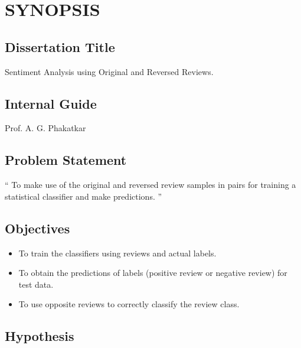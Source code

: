 \documentclass[oneside,a4paper,12pt]{pictreport}
\begin{document}
\setlength{\parindent}{11mm}
\chapter{SYNOPSIS}


\section{Dissertation Title}
Sentiment Analysis using Original and Reversed Reviews.



\section{Internal Guide}
Prof. A. G. Phakatkar



\section{Problem Statement}
\label{sec:problem_def}
`` To make use of the original and reversed review samples in pairs for training a
statistical classifier and make predictions. ''

\section{Objectives}
\begin{itemize}

    \item To train the classifiers using reviews and actual labels.
    \item To obtain the predictions of labels (positive review or negative review) for test data.
    \item To use opposite reviews to correctly classify the review class.
\end{itemize}

\section{Hypothesis}
\end{document}
